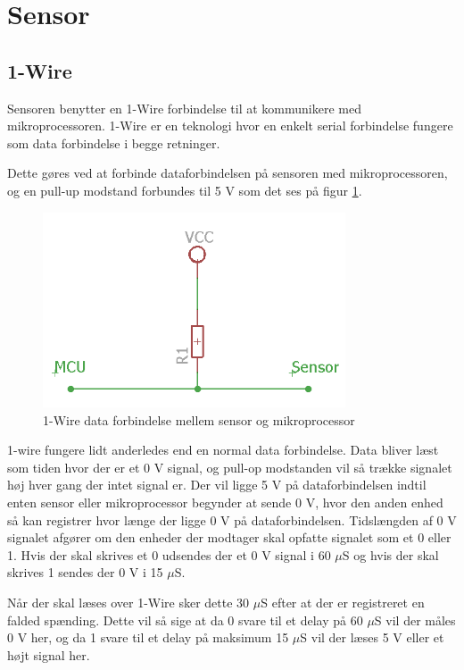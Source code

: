 \newpage
\section{Sensor}


\subsection{1-Wire}
Sensoren benytter en 1-Wire forbindelse til at kommunikere med mikroprocessoren. 1-Wire er en teknologi hvor en  enkelt serial forbindelse fungere som data forbindelse i begge retninger. 

Dette gøres ved at forbinde dataforbindelsen på sensoren med mikroprocessoren, og en pull-up modstand forbundes til 5 V som det ses på figur \ref{one_wire_schematic}. 


\begin{figure}[h!]
  \centering
  \includegraphics[width=0.8\textwidth]{figures/onewire_eksempel.png}
  \caption{1-Wire data forbindelse mellem sensor og mikroprocessor}
  \label{one_wire_schematic}
\end{figure}

1-wire fungere lidt anderledes end en normal data forbindelse. Data bliver læst som tiden hvor der er et 0 V signal, og pull-op modstanden vil så trække signalet høj hver gang der intet signal er. Der vil ligge 5 V på dataforbindelsen indtil enten sensor eller mikroprocessor begynder at sende 0 V, hvor den anden enhed så kan registrer hvor længe der ligge 0 V på dataforbindelsen. Tidslængden af 0 V signalet afgører om den enheder der modtager skal opfatte signalet som et 0 eller 1. Hvis der skal skrives et 0 udsendes der et 0 V signal i 60 $\mu$S og hvis der skal skrives 1 sendes der 0 V i 15 $\mu$S. 

Når der skal læses over 1-Wire sker dette 30 $\mu$S efter at der er registreret en falded spænding. Dette vil så sige at da 0 svare til et delay på 60 $\mu$S vil der måles 0 V her, og da 1 svare til et delay på maksimum 15 $\mu$S vil der læses 5 V eller et højt signal her.


